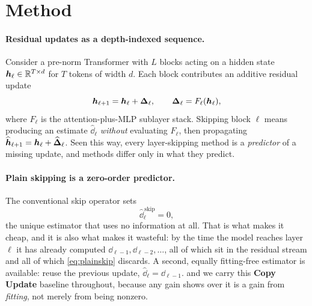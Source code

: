 \section{Method}
\label{sec:method}

\paragraph{Residual updates as a depth-indexed sequence.} Consider a pre-norm
Transformer with $L$ blocks acting on a hidden state $\bm{h}_\ell \in \mathbb{R}^{T
\times d}$ for $T$ tokens of width $d$. Each block contributes an additive
residual update
\begin{equation}
\bm{h}_{\ell+1} = \bm{h}_\ell + \bm{\Delta}_\ell,
\qquad
\bm{\Delta}_\ell = F_\ell(\bm{h}_\ell),
\label{eq:residual}
\end{equation}
where $F_\ell$ is the attention-plus-MLP sublayer stack. Skipping block $\ell$
means producing an estimate $\widehat{\dd}_\ell$ \emph{without} evaluating
$F_\ell$, then propagating $\widehat{\bm{h}}_{\ell+1} = \bm{h}_\ell +
\widehat{\bm{\Delta}}_\ell$. Seen this way, every layer-skipping method is a
\emph{predictor} of a missing update, and methods differ only in what they
predict.

\paragraph{Plain skipping is a zero-order predictor.} The conventional skip
operator sets
\begin{equation}
\widehat{\dd}^{\,\mathrm{skip}}_\ell = 0 ,
\label{eq:plainskip}
\end{equation}
the unique estimator that uses no information at all. That is what makes it cheap,
and it is also what makes it wasteful: by the time the model reaches layer $\ell$
it has already computed $\dd_{\ell-1}, \dd_{\ell-2}, \dots$, all of which sit in
the residual stream and all of which \cref{eq:plainskip} discards. A second, equally
fitting-free estimator is available: reuse the previous update,
$\widehat{\dd}_\ell = \dd_{\ell-1}$. and we carry this \textbf{Copy Update} baseline throughout,
because any gain \mname shows over it is a gain from \emph{fitting}, not merely
from being nonzero.

